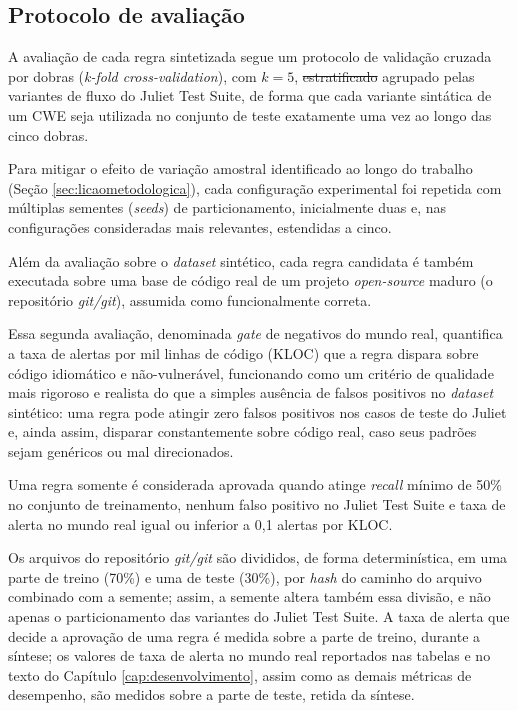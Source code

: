 \documentclass[
    12pt,                %
    openright,           %
    oneside,             %
    a4paper,             %
    english,             %
    brazil               %
]{abntex2}
\newcommand{\antigo}[1]{\sout{#1}}
\newcommand{\novo}[1]{{\color{red}#1}}
\begin{document}
\subsection{Protocolo de avaliação}
\label{sec:protocoloavaliacao}
\par
A avaliação de cada regra sintetizada segue um protocolo de validação cruzada por dobras (\textit{k-fold cross-validation}), com $k=5$, \antigo{estratificado} \novo{agrupado} pelas variantes de fluxo do Juliet Test Suite, de forma que cada variante sintática de um CWE seja utilizada no conjunto de teste exatamente uma vez ao longo das cinco dobras.
\par
Para mitigar o efeito de variação amostral identificado ao longo do trabalho (Seção \ref{sec:licaometodologica}), cada configuração experimental foi repetida com múltiplas sementes (\textit{seeds}) de particionamento, inicialmente duas e, nas configurações consideradas mais relevantes, estendidas a cinco.
\par
Além da avaliação sobre o \textit{dataset} sintético, cada regra candidata é também executada sobre uma base de código real de um projeto \textit{open-source} maduro (o repositório \textit{git/git}), assumida como funcionalmente correta.
\par
Essa segunda avaliação, denominada \textit{gate} de negativos do mundo real, quantifica a taxa de alertas por mil linhas de código (KLOC) que a regra dispara sobre código idiomático e não-vulnerável, funcionando como um critério de qualidade mais rigoroso e realista do que a simples ausência de falsos positivos no \textit{dataset} sintético: uma regra pode atingir zero falsos positivos nos casos de teste do Juliet e, ainda assim, disparar constantemente sobre código real, caso seus padrões sejam genéricos ou mal direcionados.
\par
Uma regra somente é considerada aprovada quando atinge \textit{recall} mínimo de 50\% no conjunto de treinamento, nenhum falso positivo no Juliet Test Suite e taxa de alerta no mundo real igual ou inferior a 0,1 alertas por KLOC.
\par
\novo{Os arquivos do repositório \textit{git/git} são divididos, de forma determinística, em uma parte de treino (70\%) e uma de teste (30\%), por \textit{hash} do caminho do arquivo combinado com a semente; assim, a semente altera também essa divisão, e não apenas o particionamento das variantes do Juliet Test Suite. A taxa de alerta que decide a aprovação de uma regra é medida sobre a parte de treino, durante a síntese; os valores de taxa de alerta no mundo real reportados nas tabelas e no texto do Capítulo \ref{cap:desenvolvimento}, assim como as demais métricas de desempenho, são medidos sobre a parte de teste, retida da síntese.}
\end{document}
